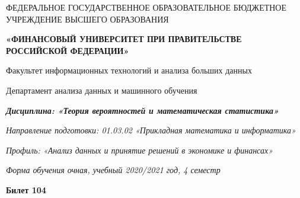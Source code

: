 \documentclass[a4paper,11pt]{article}
\begin{document}
\begin{center}
ФЕДЕРАЛЬНОЕ ГОСУДАРСТВЕННОЕ ОБРАЗОВАТЕЛЬНОЕ БЮДЖЕТНОЕ УЧРЕЖДЕНИЕ ВЫСШЕГО ОБРАЗОВАНИЯ

    \textbf{«ФИНАНСОВЫЙ УНИВЕРСИТЕТ ПРИ ПРАВИТЕЛЬСТВЕ РОССИЙСКОЙ ФЕДЕРАЦИИ»}

Факультет информационных технологий и анализа больших данных

Департамент анализа данных и машинного обучения

\textit{
	\textbf{Дисциплина: «Теория вероятностей и математическая статистика»}}

\textit{Направление подготовки: 01.03.02 «Прикладная математика и информатика»}

\textit{Профиль: «Анализ данных и принятие решений в экономике и финансах»}

\textit{Форма обучения очная, учебный 2020/2021 год, 4 семестр}

\textbf{Билет 104}

\end{center}
\end{document}
